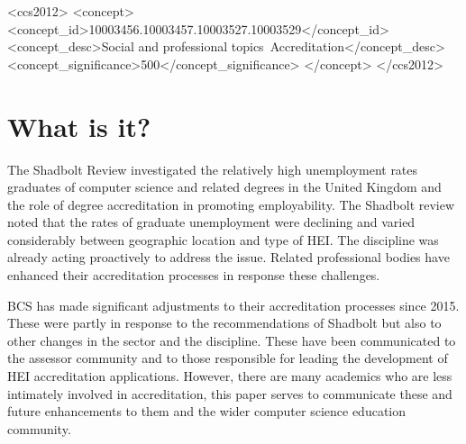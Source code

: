 \documentclass[sigconf]{acmart}
\begin{document}
\begin{CCSXML}
<ccs2012>
<concept>
<concept_id>10003456.10003457.10003527.10003529</concept_id>
<concept_desc>Social and professional topics~Accreditation</concept_desc>
<concept_significance>500</concept_significance>
</concept>
</ccs2012>
\end{CCSXML}




\maketitle


\section {What is it?}

The Shadbolt Review \cite{shadbolt2016shadbolt} investigated the relatively high unemployment rates graduates of computer science and related degrees in the United Kingdom and the role of degree accreditation in promoting employability. The Shadbolt review noted that the rates of graduate unemployment were declining and varied considerably between geographic location and type of HEI. The discipline was already acting proactively to address the issue.  Related professional bodies have enhanced their accreditation processes in response these challenges.

BCS has made significant adjustments to their accreditation processes since 2015. These were partly in response to the recommendations of Shadbolt but also to other changes in the sector and the discipline.  These have been communicated to the assessor community and to those responsible for leading the development of HEI accreditation applications. However, there are many academics who are less intimately involved in accreditation, this paper serves to communicate these and future enhancements to them and the wider computer science education community.
\end{document}
